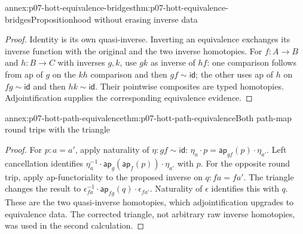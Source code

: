 \begin{annexitem}{annex:p07-hott-equivalence-bridges}{thm:p07-hott-equivalence-bridges}{Propositionhood without erasing inverse data}
\begin{proof}
Identity is its own quasi-inverse. Inverting an equivalence exchanges
its inverse function with the original and the two inverse homotopies.
For $f:A\to B$ and $h:B\to C$ with inverses $g,k$, use $g k$ as
inverse of $h f$: one comparison follows from ap of $g$ on the
$k h$ comparison and then $g f\sim\mathsf{id}$; the other uses ap
of $h$ on $f g\sim\mathsf{id}$ and then $h k\sim\mathsf{id}$.
Their pointwise composites are typed homotopies. Adjointification
supplies the corresponding equivalence evidence.
\end{proof}
\end{annexitem}

\begin{annexitem}{annex:p07-hott-path-equivalence}{thm:p07-hott-path-equivalence}{Both path-map round trips with the triangle}
\begin{proof}
For $p:a=a'$, apply naturality of $\eta:g f\sim\mathsf{id}$:
$\eta_a\cdot p=\mathsf{ap}_{g f}(p)\cdot\eta_{a'}$.
Left cancellation identifies
$\eta_a^{-1}\cdot\mathsf{ap}_g(\mathsf{ap}_f(p))\cdot\eta_{a'}$
with $p$. For the opposite round trip, apply ap-functoriality to
the proposed inverse on $q:f a=f a'$. The triangle changes the result to
$\epsilon_{f a}^{-1}\cdot\mathsf{ap}_{f g}(q)\cdot\epsilon_{f a'}$.
Naturality of $\epsilon$ identifies this with $q$. These are the
two quasi-inverse homotopies, which adjointification upgrades to
equivalence data. The corrected triangle, not arbitrary raw inverse
homotopies, was used in the second calculation.
\end{proof}
\end{annexitem}

